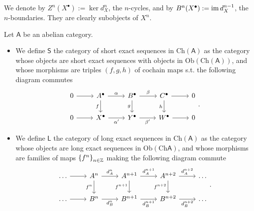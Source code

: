 \begin{rem}[Notation]
	We denote by $Z^n(X^\bullet) := \ker d_X^n$, the $n$-cycles,
	and by $B^n(X^\bullet) := \operatorname{im} d_X^{n-1}$, the $n$-boundaries.
	They are clearly subobjects of $X^n$.
\end{rem}

\begin{defn}
	Let $\mathsf{A}$ be an abelian category.
	\begin{itemize}
		\item We define $\mathsf{S}$ the category of short exact sequences
	in $\mathrm{Ch}(\mathsf{A})$ as the category whose objects
	are short exact sequences with objects in $\mathrm{Ob} \left(\mathrm{Ch}(\mathsf{A})\right)$,
	and whose morphisms are triples $(f,g,h)$ of cochain maps s.t.
	the following diagram commutes
	\begin{equation}
	\begin{tikzcd}
		0 \arrow[r, "", rightarrow] &
		A^\bullet \arrow[r, "\alpha", rightarrow] \arrow[d, "f"', rightarrow] &
		B^\bullet \arrow[r, "\beta", rightarrow] \arrow[d, "g"', rightarrow] &
		C^\bullet \arrow[r, "", rightarrow] \arrow[d, "h"', rightarrow] &
		0 \\
		0 \arrow[r, "", rightarrow] &
		X^\bullet \arrow[r, "\alpha'"', rightarrow] &
		Y^\bullet \arrow[r, "\beta'"', rightarrow] &
		W^\bullet \arrow[r, "", rightarrow] &
		0 
	\end{tikzcd}
	.\end{equation} 
		\item We define $\mathsf{L}$ the category of long exact sequences
	in $\mathrm{Ch}(\mathsf{A})$ as the category whose objects
	are long exact sequences in $\mathrm{Ob} \left(\mathrm{Ch}\mathsf{A}\right)$,
	and whose morphisms are families of maps $\left\{ f^n \right\}_{n \in \mathbb{Z}}$ making
	the following diagram commute
	\begin{equation}
	\begin{tikzcd}
		\ldots \arrow[r, "", rightarrow] &
		A^n \arrow[r, "d_A^n", rightarrow] \arrow[d, "f^n"', rightarrow] &
		A^{n+1} \arrow[r, "d_A^{n+1}", rightarrow] \arrow[d, "f^{n+1}"', rightarrow] &
		A^{n+2} \arrow[r, "d_A^{n+2}", rightarrow] \arrow[d, "f^{n+2}"', rightarrow] &
		\ldots \\
		\ldots \arrow[r, "", rightarrow] &
		B^n \arrow[r, "d_B^n"', rightarrow] &
		B^{n+1} \arrow[r, "d_B^{n+1}"', rightarrow] &
		B^{n+2} \arrow[r, "d_B^{n+2}"', rightarrow] &
		\ldots 
	\end{tikzcd}
	.\end{equation} 
	\end{itemize}
\end{defn}

